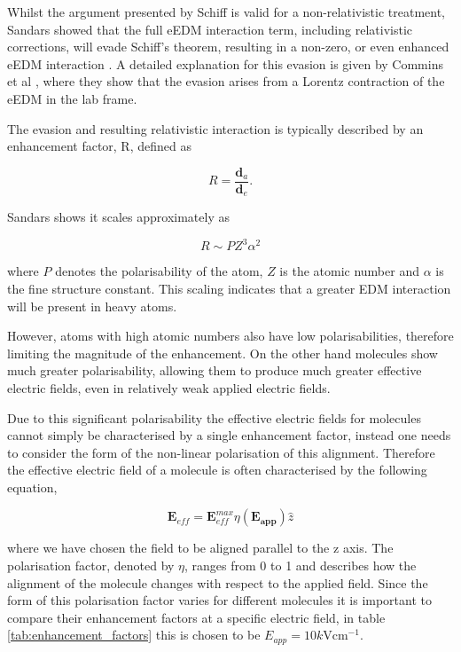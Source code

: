 Whilst the argument presented by Schiff is valid for a non-relativistic treatment, Sandars showed that the full eEDM interaction term, including relativistic corrections, will evade Schiff's theorem, resulting in a non-zero, or even enhanced eEDM interaction \cite{Sandars_1965}. A detailed explanation for this evasion is given by Commins et al \cite{Commins_2007}, where they show that the evasion arises from a Lorentz contraction of the eEDM in the lab frame.

The evasion and resulting relativistic interaction is typically described by an enhancement factor, R, defined as

\begin{equation} \label{enhancement_factor_definition}
    R = \frac{\mathbf{d}_{a}}{\mathbf{d}_e}.
\end{equation}

Sandars shows it scales approximately as

\begin{equation} \label{enhancement_factor_scaling}
    R \sim P Z^{3} \alpha^{2}
\end{equation}

where $P$ denotes the polarisability of the atom, $Z$ is the atomic number and $\alpha$ is the fine structure constant. This scaling indicates that a greater EDM interaction will be present in heavy atoms.

However, atoms with high atomic numbers also have low polarisabilities, therefore limiting the magnitude of the enhancement. On the other hand molecules show much greater polarisability, allowing them to produce much greater effective electric fields, even in relatively weak applied electric fields.

Due to this significant polarisability the effective electric fields for molecules cannot simply be characterised by a single enhancement factor, instead one needs to consider the form of the non-linear polarisation of this alignment. Therefore the effective electric field of a molecule is often characterised by the following equation,

\begin{equation}
    \mathbf{E}_{eff} = \mathbf{E}^{max}_{eff} \eta (\mathbf{E_{app}}) \hat{z}
    \label{molecule_effective_field}
\end{equation}

where we have chosen the field to be aligned parallel to the z axis. The polarisation factor, denoted by $\eta$, ranges from 0 to 1 and describes how the alignment of the molecule changes with respect to the applied field. Since the form of this polarisation factor varies for different molecules it is important to compare their enhancement factors at a specific electric field, in table \ref{tab:enhancement_factors} this is chosen to be $E_{app} = 10 k\text{V} \text{cm}^{-1}$.

